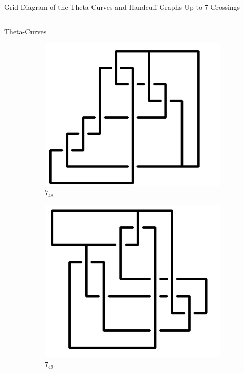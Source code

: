 \documentclass[final]{beamer}
\begin{document}
\begin{frame}[t]
\begin{alertblock}{Grid Diagram of the Theta-Curves and Handcuff Graphs Up to 7 Crossings}
\begin{columns}[t]
\begin{column}{0.5\textwidth}
\begin{alertblock}{Theta-Curves}
\begin{figure}
\begin{subfigure}{0.075\textwidth}
    \includegraphics[width=\columnwidth]{../Midterm_Poster/grid_diagram/theta_7_48.png}
    \caption{$7_{48}$} 
    \end{subfigure}
    \begin{subfigure}{0.075\textwidth}
    \includegraphics[width=\columnwidth]{../Midterm_Poster/grid_diagram/theta_7_49.png}
    \caption{$7_{49}$} 
    \end{subfigure}
    \begin{subfigure}{0.075\textwidth}

\end{subfigure}
\end{figure}
\end{alertblock}
\end{column}
\end{columns}
\end{alertblock}
\end{frame}
\end{document}
